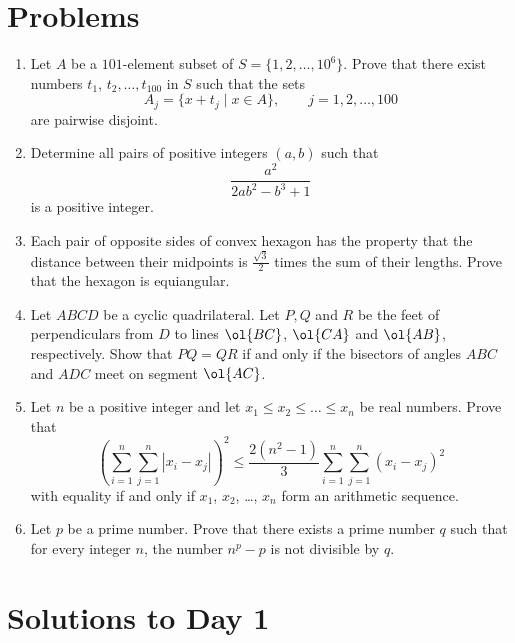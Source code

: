 \documentclass[11pt]{scrartcl}
\begin{document}
\section{Problems}
\begin{enumerate}[\bfseries 1.]
\item %
Let $A$ be a $101$-element subset of $S=\{1,2,\dots,10^6\}$.
Prove that there exist numbers $t_1$, $t_2, \dots, t_{100}$ in $S$ such that the sets
\[ A_j=\{x+t_j\mid x\in A\},\qquad j=1,2,\dots,100  \]
are pairwise disjoint.

\item %
Determine all pairs of positive integers $(a,b)$ such that
\[ \frac{a^2}{2ab^2-b^3+1} \]
is a positive integer.

\item %
Each pair of opposite sides of convex hexagon has the property that
the distance between their midpoints is $\frac{\sqrt3}{2}$
times the sum of their lengths.
Prove that the hexagon is equiangular.

\item %
Let $ABCD$ be a cyclic quadrilateral.
Let $P, Q$ and $R$ be the feet of perpendiculars
from $D$ to lines $\ol{BC}$, $\ol{CA}$ and $\ol{AB}$, respectively.
Show that $PQ = QR$ if and only if the
bisectors of angles $ABC$ and $ADC$ meet on segment $\ol{AC}$.

\item %
Let $n$ be a positive integer and
let $x_1 \le x_2 \le \dots \le x_n$ be real numbers.
Prove that
\[ \left(\sum_{i=1}^{n}\sum_{j=1}^{n} |x_i - x_j|\right)^2
  \le \frac{2(n^2-1)}{3}\sum_{i=1}^{n}\sum_{j=1}^{n} (x_i - x_j)^2 \]
with equality if and only if $x_1$, $x_2$, \dots, $x_n$
form an arithmetic sequence.

\item %
Let $p$ be a prime number.
Prove that there exists a prime number $q$ such that for every integer $n$,
the number $n^p-p$ is not divisible by $q$.

\end{enumerate}
\pagebreak

\section{Solutions to Day 1}
\end{document}
